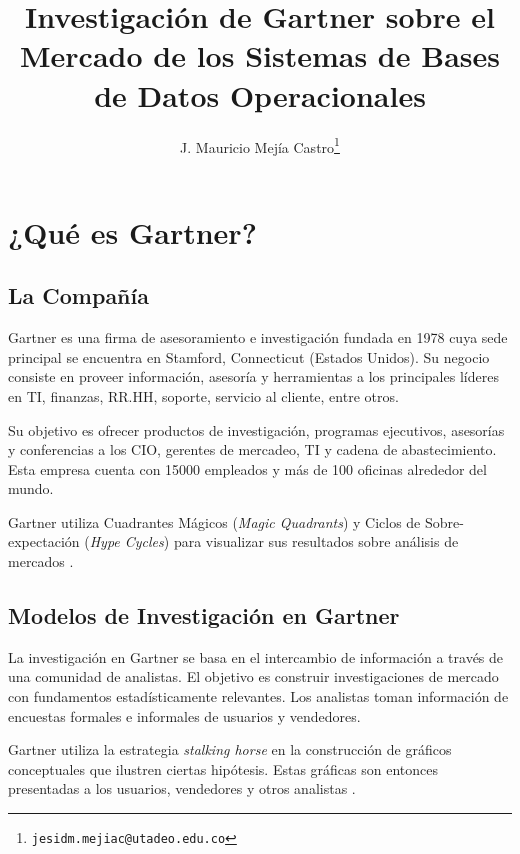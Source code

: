 \documentclass[11pt,letterpaper]{article}
\author{J. Mauricio Mej{\'i}a Castro\thanks{\tt jesidm.mejiac@utadeo.edu.co}}
\title{Investigación de Gartner sobre el Mercado de los Sistemas de Bases de Datos Operacionales}
\affil{Universidad Jorge Tadeo Lozano}
\begin{document}

\maketitle
\tableofcontents
\newpage
\section{¿Qué es Gartner?}
	\subsection{La Compañía}
	Gartner es una firma de asesoramiento e investigación fundada en 1978 cuya %
	sede principal se encuentra en Stamford, Connecticut (Estados Unidos). %
	Su negocio consiste en proveer información, asesoría y herramientas a los %
	principales líderes en TI, finanzas, RR.HH, soporte, servicio al cliente, %
	entre otros.
	\par Su objetivo es ofrecer productos de investigación, programas %
	ejecutivos, asesorías y conferencias a los CIO, gerentes de mercadeo, TI y cadena de abastecimiento. Esta empresa cuenta con 15000 empleados y más de 100 oficinas alrededor del mundo.
	\par Gartner utiliza Cuadrantes Mágicos ({\em Magic Quadrants}) y Ciclos de Sobre-expectación ({\em Hype Cycles}) para visualizar sus resultados sobre análisis de mercados \cite{wiki:Gartner}.
	
	\subsection{Modelos de Investigación en Gartner}
	La investigación en Gartner se basa en el intercambio de información a través de una comunidad de analistas. El objetivo es construir investigaciones de mercado con fundamentos estadísticamente relevantes. Los analistas toman información de encuestas formales e informales de usuarios y vendedores.
	\par Gartner utiliza la estrategia {\em stalking horse} en la construcción de gráficos conceptuales que ilustren ciertas hipótesis. Estas gráficas son entonces presentadas a los usuarios, vendedores y otros analistas \cite{Burton2002}.
	
\end{document}
